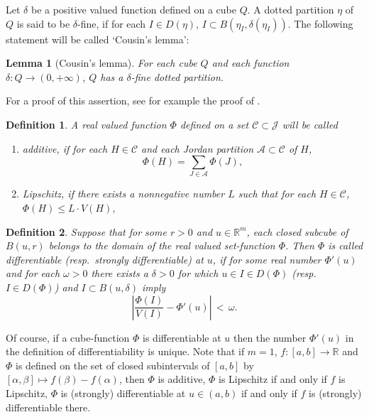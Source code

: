 \documentclass{article}
\newtheorem{definition}{Definition}
\newtheorem{lemma}{Lemma}
\newcommand{\R}{\ensuremath{\mathbb R}}
\newcommand{\J}{\mathscr{J}}
\newcommand{\dd}{\delta}
\begin{document}
Let \(\delta\) be a positive valued function defined on a cube \(Q\). A dotted partition \(\eta\) of \(Q\)
is said to be \(\delta\)-fine, if for each \(I\in
D(\eta)\), \(I\subset B(\eta _I,\delta(\eta _I))\).
The following statement will be called `Cousin's lemma':

\begin{lemma}[Cousin's lemma]\label{Couslemma}
For each cube \(Q\) and each function \(\delta:Q\to(0,+\infty)\), \(Q\) has a  \(\delta\)-fine dotted partition.
\end{lemma}

For a proof of this assertion, see for example the proof of
\cite[Lemma 7.3.2]{Pfeffer:93}.

\begin{definition}
A real valued function $\Phi$ defined on a set $\mathcal{C}\subset\J$ will be called
\begin{enumerate}
\item \emph{additive}, if for each $ H\in\mathcal{C} $ and each Jordan
partition $\mathcal{A}\subset\mathcal{C}$ of $H$, $$
\Phi(H)=\sum_{J\in\mathcal{A}}\Phi(J), $$ \item \emph{Lipschitz},
if there exists a nonnegative number $ L $ such that for each $
H\in\mathcal{C} $, $ \Phi(H)\le L\cdot V(H) $,
\end{enumerate}
\end{definition}

\begin{definition}
Suppose that for some $r>0$ and $u\in\R^m $, each closed subcube
of $B(u,r)$ belongs to the domain of the real valued set-function
$\Phi$. Then $\Phi$ is called \emph{differentiable}
(resp.~\emph{strongly differentiable}) at  $u$,  if for some real
number $ \Phi'(u) $ and for each $\omega>0 $ there exists a
$\dd>0$ for which $ u\in I\in D(\Phi)$ (resp.~$I\in D(\Phi)$) and
$I\subset B(u,\dd)$ imply
$$ \left|\frac{\Phi(I)}{V(I)} - \Phi'(u)\right|\,<\,\omega. $$
\end{definition}

Of course, if a cube-function $\Phi$ is differentiable at $u$ then
the number $\Phi'(u)$ in the definition of differentiability is
unique. Note that if $m=1$, $f:[a,b]\to\R$ and $\Phi$ is defined
on the set of closed subintervals of $[a,b]$ by
$[\alpha,\beta]\mapsto f(\beta)-f(\alpha)$, then $ \Phi $ is
additive, $ \Phi $ is Lipschitz if and only if $ f $ is Lipschitz,
$ \Phi $ is (strongly) differentiable at $ u\in(a,b)$ if and only
if $ f $ is (strongly) differentiable there.
\end{document}
